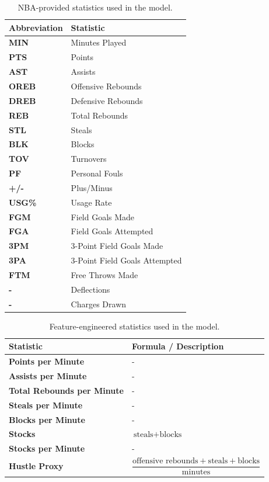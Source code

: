 \documentclass[11pt]{article}
\begin{document}
\begin{table}[ht]
    \centering
    \renewcommand{\arraystretch}{1.12}
    \setlength{\tabcolsep}{8pt}
    \begin{tabularx}{0.82\textwidth}{>{\bfseries}l X}
    \toprule
    Abbreviation & Statistic \\
    \midrule
    MIN & Minutes Played \\
    PTS & Points \\
    AST & Assists \\
    OREB & Offensive Rebounds \\
    DREB & Defensive Rebounds \\
    REB & Total Rebounds \\
    STL & Steals \\
    BLK & Blocks \\
    TOV & Turnovers \\
    PF & Personal Fouls \\
    +/- & Plus/Minus \\
    USG\% & Usage Rate \\
    FGM & Field Goals Made \\
    FGA & Field Goals Attempted \\
    3PM & 3-Point Field Goals Made \\
    3PA & 3-Point Field Goals Attempted \\
    FTM & Free Throws Made \\
    - & Deflections \\
    - & Charges Drawn \\
    \bottomrule
    \end{tabularx}
    \caption{NBA-provided statistics used in the model.}
    \label{tab:nba_stats_clean}
    \end{table}

    \begin{table}[ht]
        \centering
        \renewcommand{\arraystretch}{1.2}
        \setlength{\tabcolsep}{6pt}
        \small
        \begin{tabularx}{\textwidth}{>{\bfseries}l >{\raggedright\arraybackslash}X}
        \toprule
        Statistic & Formula / Description \\
        \midrule
        Points per Minute & - \\
        Assists per Minute & - \\
        Total Rebounds per Minute & - \\
        Steals per Minute & - \\
        Blocks per Minute & - \\
        Stocks & $\text{steals} + \text{blocks}$ \\
        Stocks per Minute & - \\
        Hustle Proxy & $\dfrac{\text{offensive rebounds} + \text{steals} + \text{blocks}}{\text{minutes}}$ \\
        \bottomrule
        \end{tabularx}
        \caption{Feature-engineered statistics used in the model.}
        \label{tab:engineered_stats_clean}
        \end{table}
\end{document}
